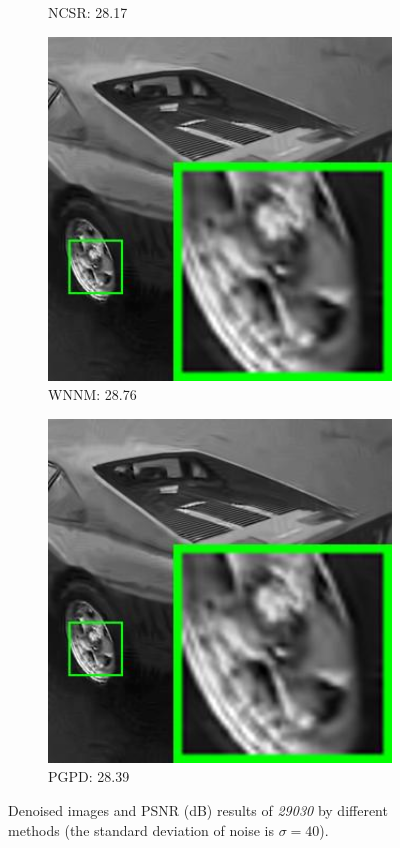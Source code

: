 \begin{figure}
\begin{subfigure}[t]{0.24\textwidth}
		\caption{NCSR: 28.17}
    \end{subfigure}
    \hfill
    \begin{subfigure}[t]{0.24\textwidth}
        \centering
        \includegraphics[width=1\textwidth]{images/pgpd/200img/br_our_40_29030.jpg}
		\caption{WNNM: 28.76}
    \end{subfigure}
    \hfill
    \begin{subfigure}[t]{0.24\textwidth}
        \centering
        \includegraphics[width=1\textwidth]{images/pgpd/200img/br_our_40_29030.jpg}
		\caption{PGPD: 28.39}
    \end{subfigure}
    \caption{Denoised images and PSNR (dB) results of \textsl{29030} by different methods (the standard deviation of noise is $\sigma=40$).}
    \label{fig2-15}
\end{figure}


